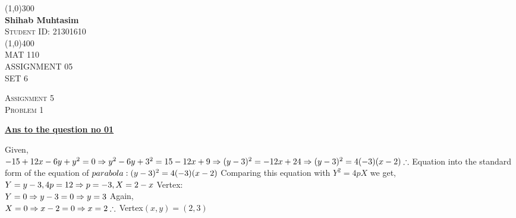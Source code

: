 \documentclass{article}
\begin{document}
 
    \begin{titlepage}
    \begin{center}
    \line(1,0){300}\\
    [0.25 in]
    \huge{\bfseries Shihab Muhtasim}\\
    [0.5 cm]
    \textsc{\Large Student ID: 21301610}\\
    \line(1,0){400}\\
    [2 cm]
    \textsc{\LARGE MAT 110}\\
    [0.5 cm]
    \textsc{\LARGE ASSIGNMENT 05}\\
    [0.5 cm]
    \textsc{\LARGE SET 6}\\
    \end{center}
    \end{titlepage}
\begin{newpage}
    \begin{flushright}
    \textsc{Assignment 5}\\
    \textsc{Problem 1}\\
    [1 cm]
    \end{flushright}
\begin{center}
  \textbf{\Large \underline {Ans to the question no 01}}\\
  [0.5 cm]
\end{center}
\Large {Given, \\[3mm]
$-15+12x-6y+y^2=0\\[3mm]
\Rightarrow y^2-6y+3^2=15-12x+9\\[3mm]
\Rightarrow (y-3)^2=-12x+24\\[3mm]
\Rightarrow (y-3)^2=4(-3)(x-2)\\[3mm]
\therefore$ Equation into the standard form of the equation of $ parabola:(y-3)^2=4(-3)(x-2)\\[3mm]$
Comparing this equation with $Y^2=4pX$ we get,\\[3mm]
$Y=y-3,\\[3mm]
4p=12\Rightarrow p=-3,\\[3mm]
X=2-x\\[3mm]$
Vertex:\\[3mm]
$Y=0\\[3mm] \Rightarrow y-3=0 \\[3mm]\Rightarrow y=3\\[3mm]$
Again,\\[3mm]
$X=0 \\[3mm] \Rightarrow x-2=0 \\[3mm] \Rightarrow x=2\\[3mm]
\therefore$ Vertex$(x,y)= (2,3)$\\[5mm]
}
\end{newpage}
\end{document}
